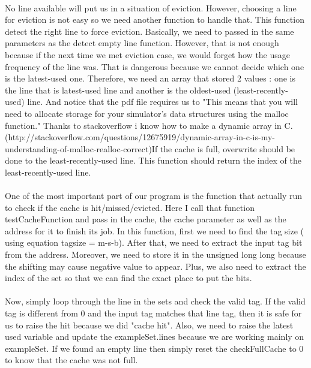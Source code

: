 \documentclass[a4paper]{article}
\begin{document}
\paragraph{} 
No line available will put us in a situation of eviction. However, choosing a line for eviction is not easy so we need another function to handle that. This function detect the right line to force eviction. Basically, we need to passed in the same 
parameters as the detect empty line function. However, that is not enough because if the next time we met eviction case, we would forget how the usage frequency of the line was. That is dangerous because we cannot decide which one is the latest-used one. Therefore, we need an array that stored 2 values : one is the line that is latest-used line and another is the oldest-used (least-recently-used) line. And notice that the pdf file requires us to "This means that you will need to allocate storage for your simulator’s data structures using the malloc function." Thanks to stackoverflow i know how to make a dynamic array in C. (http://stackoverflow.com/questions/12675919/dynamic-array-in-c-is-my-understanding-of-malloc-realloc-correct)If the cache is full, overwrite should be done to the least-recently-used line.  This function should return the index of the least-recently-used line.   


\paragraph{} 
One of the most important part of our program is the function that actually run to check if the cache is hit/missed/evicted. Here I call that function testCacheFunction and pass in the cache, the cache parameter as well as the address for it to finish its job. In this function, first we need to find the tag size ( using equation tagsize = m-s-b). After that, we need to extract the input tag bit from the address. Moreover, we need to store it in the unsigned long long because the shifting may cause negative value to appear. Plus, we also need to extract the index of the set so that we can find the exact place to put the bits.  

\paragraph{} 
Now, simply loop through the line in the sets and check the valid tag. If the valid tag is different from 0 and the input tag matches that line tag, then it is safe for us to raise the hit because we did "cache hit". Also, we need to raise the latest used variable and update the exampleSet.lines because we are working mainly on exampleSet. If we found an empty line then simply reset the checkFullCache to 0 to know that the cache was not full.  
\end{document}
